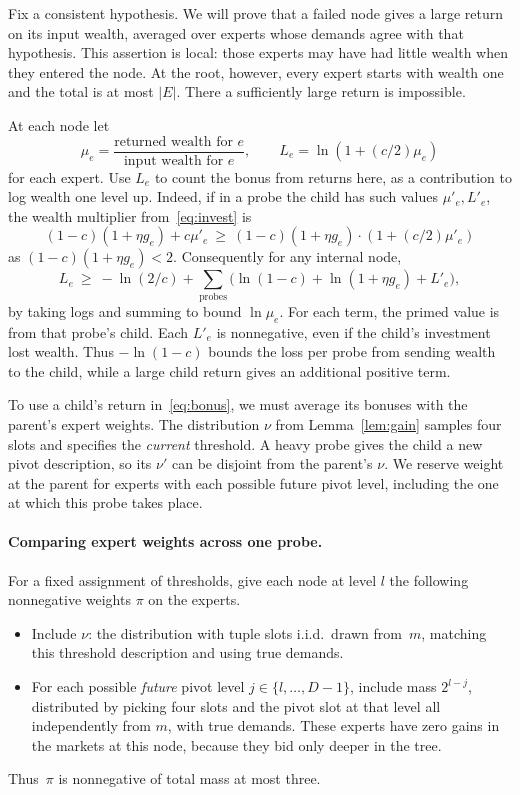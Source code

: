 Fix a consistent hypothesis. We will prove that a failed node gives a
large return on its input wealth, averaged over experts whose demands
agree with that hypothesis. This assertion is local: those experts may
have had little wealth when they entered the node. At the root, however,
every expert starts with wealth one and the total is at most \(|E|\).
There a sufficiently large return is impossible.

At each node let
\[
  \mu_e = \frac{\text{returned wealth for }e}
                     {\text{input wealth for }e},
       \qquad L_e = \ln(1+(c/2)\mu_e)
\]
for each expert.
Use \(L_e\) to count the bonus from returns here,
as a contribution to log wealth one level up.
Indeed, if in a probe the child has such values
\(\mu'_e,L'_e\), the wealth multiplier from~\eqref{eq:invest} is
\[
    (1-c)(1+\eta g_e)+c\mu'_e \ \ge\
    (1-c)(1+\eta g_e)\cdot (1+(c/2)\mu'_e)
\]
as \((1-c)(1+\eta g_e)<2\).
Consequently for any internal node,
\begin{equation}\label{eq:bonus}
 L_e\ \ge\ -\ln(2/c)+
     \sum_{\text{probes}}
     \big(\ln(1-c) + \ln(1+\eta g_e)+L'_e\big),
\end{equation}
by taking logs and summing to bound \(\ln\mu_e\).
For each term, the primed value is from that probe's child.
Each \(L'_e\) is nonnegative, even if the child's investment lost
wealth. Thus \(-\ln(1-c)\) bounds the loss per probe from sending
wealth to the child, while a large child return gives an additional
positive term.

To use a child's return in~\eqref{eq:bonus}, we must average its
bonuses with the parent's expert weights. The distribution \(\nu\)
from Lemma~\ref{lem:gain} samples four slots and specifies the
\emph{current} threshold. A heavy probe gives the child a new pivot
description, so its \(\nu'\) can be disjoint from the parent's \(\nu\).
We reserve weight at the parent for experts with each possible future
pivot level, including the one at which this probe takes place.

\paragraph{Comparing expert weights across one probe.}
For a fixed assignment of thresholds, give each node at level \(l\)
the following nonnegative weights \(\pi\) on the experts.

\begin{itemize}
 \item Include \(\nu\):
 the distribution with tuple slots i.i.d.\ drawn from~\(m\),
 matching this threshold description and using true demands.
 \item For each possible \emph{future} pivot level
 \(j\in\{l,\ldots,D-1\}\),
 include mass \(2^{l-j}\), distributed by picking four slots
 and the pivot slot at that level all independently from \(m\),
 with true demands. These experts have zero gains in the markets
 at this node, because they bid only deeper in the tree.
\end{itemize}
Thus~\(\pi\) is nonnegative of total mass at most three.

